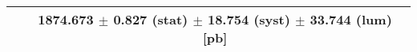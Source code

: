 \begin{tabular}{lc}
\hline
                               & 1874.673 $\pm$ 0.827 (stat) $\pm$ 18.754 (syst) $\pm$ 33.744 (lum) [pb]  \\
\hline
\end{tabular}
